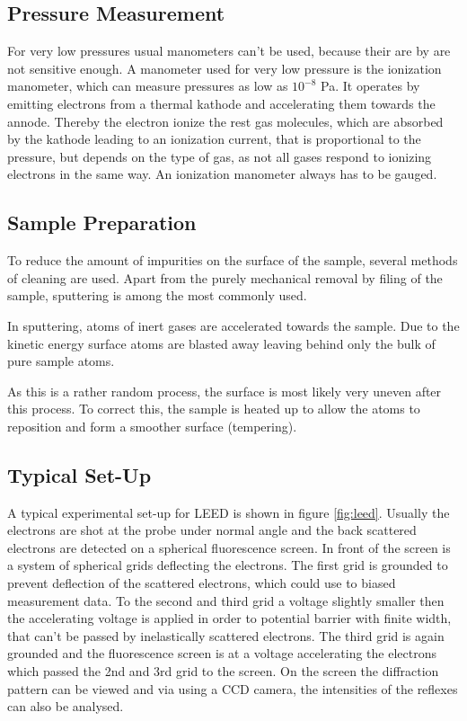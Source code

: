 \documentclass[a4paper]{scrartcl}
\numberwithin{equation}{section}
\numberwithin{figure}{section}
\numberwithin{table}{section}
\begin{document}
\subsection{Pressure Measurement}
For very low pressures usual manometers can't be used, because their are by are not sensitive enough. A manometer used for very low pressure is the ionization manometer, which can measure pressures as low as $10^{-8}$ Pa. It operates by emitting electrons from a thermal kathode and accelerating them towards the annode. Thereby the electron ionize the rest gas molecules, which are absorbed by the kathode leading to an ionization current, that is proportional to the pressure, but depends on the type of gas, as not all gases respond to ionizing electrons in the same way. An ionization manometer always has to be gauged.

\subsection{Sample Preparation}
To reduce the amount of impurities on the surface of the sample, several methods of cleaning are used. Apart from the purely mechanical removal by filing of the sample, sputtering is among the most commonly used. 

In sputtering, atoms of inert gases are accelerated towards the sample. Due to the kinetic energy surface atoms are blasted away leaving behind only the bulk of pure sample atoms.

As this is a rather random process, the surface is most likely very uneven after this process. To correct this, the sample is heated up to allow the atoms to reposition and form a smoother surface (tempering).

\subsection{Typical Set-Up}
A typical experimental set-up for LEED is shown in figure \ref{fig:leed}. Usually the electrons are shot at the probe under normal angle and the back scattered electrons are detected on a spherical fluorescence screen. In front of the screen is a system of spherical grids deflecting the electrons. The first grid is grounded to prevent deflection of the scattered electrons, which could use to biased measurement data. To the second and third grid a voltage slightly smaller then the accelerating voltage is applied in order to potential barrier with finite width, that can't be passed by inelastically scattered electrons. The third grid is again grounded and the fluorescence screen is at a voltage accelerating the electrons which passed the 2nd and 3rd grid to the screen. On the screen the diffraction pattern can be viewed and via using a CCD camera, the intensities of the reflexes can also be analysed.
\end{document}
